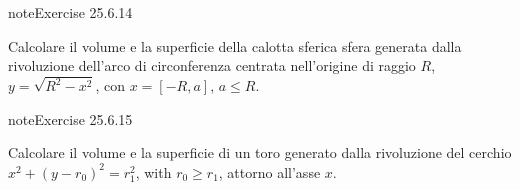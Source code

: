 \documentclass[letterpaper,10pt,italian]{jupyterBook}
\begin{document}
\begin{sphinxadmonition}{note}{Exercise 25.6.14}





\sphinxAtStartPar
Calcolare il volume e la superficie della calotta sferica sfera generata dalla rivoluzione dell’arco di circonferenza centrata nell’origine di raggio \(R\), \(y = \sqrt{R^2 - x^2}\), con \(x = [-R, a]\), \(a \le R\).
\end{sphinxadmonition}
 \label{exercise:ch/infinitesimal_calculus/integrals-problems-exercise-14}

\begin{sphinxadmonition}{note}{Exercise 25.6.15}





\sphinxAtStartPar
Calcolare il volume e la superficie di un toro generato dalla rivoluzione del cerchio \(x^2 + (y-r_0)^2 = r_1^2\), with \(r_0 \ge r_1\), attorno all’asse \(x\).
\end{sphinxadmonition}



\sphinxstepscope
\end{document}
